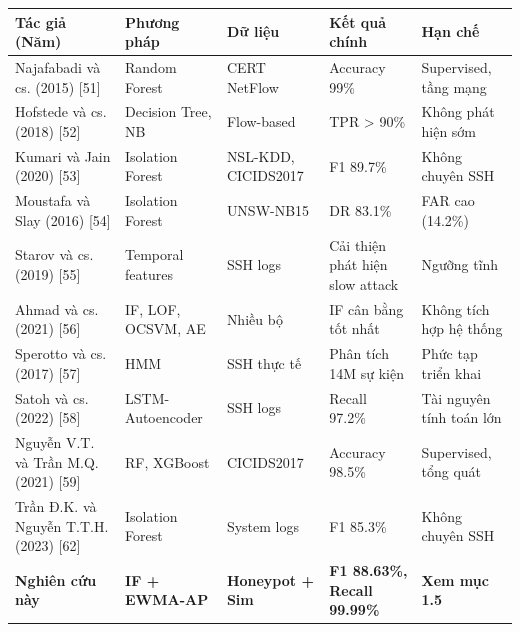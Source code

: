 \documentclass[
  a4paper]{report}
\newcounter{none} %
\begin{document}
{\def\LTcaptype{none} %
\begin{longtable}[]{@{}
  >{\raggedright\arraybackslash}p{}
  >{\raggedright\arraybackslash}p{}
  >{\raggedright\arraybackslash}p{}
  >{\raggedright\arraybackslash}p{}
  >{\raggedright\arraybackslash}p{}@{}}
\toprule\noalign{}
\begin{minipage}[b]{\linewidth}\raggedright
Tác giả (Năm)
\end{minipage} & \begin{minipage}[b]{\linewidth}\raggedright
Phương pháp
\end{minipage} & \begin{minipage}[b]{\linewidth}\raggedright
Dữ liệu
\end{minipage} & \begin{minipage}[b]{\linewidth}\raggedright
Kết quả chính
\end{minipage} & \begin{minipage}[b]{\linewidth}\raggedright
Hạn chế
\end{minipage} \\
\midrule\noalign{}
\endhead
\bottomrule\noalign{}
\endlastfoot
Najafabadi và cs. (2015) {[}51{]} & Random Forest & CERT NetFlow &
Accuracy 99\% & Supervised, tầng mạng \\
Hofstede và cs. (2018) {[}52{]} & Decision Tree, NB & Flow-based & TPR
\textgreater{} 90\% & Không phát hiện sớm \\
Kumari và Jain (2020) {[}53{]} & Isolation Forest & NSL-KDD, CICIDS2017
& F1 89.7\% & Không chuyên SSH \\
Moustafa và Slay (2016) {[}54{]} & Isolation Forest & UNSW-NB15 & DR
83.1\% & FAR cao (14.2\%) \\
Starov và cs. (2019) {[}55{]} & Temporal features & SSH logs & Cải thiện
phát hiện slow attack & Ngưỡng tĩnh \\
Ahmad và cs. (2021) {[}56{]} & IF, LOF, OCSVM, AE & Nhiều bộ & IF cân
bằng tốt nhất & Không tích hợp hệ thống \\
Sperotto và cs. (2017) {[}57{]} & HMM & SSH thực tế & Phân tích 14M sự
kiện & Phức tạp triển khai \\
Satoh và cs. (2022) {[}58{]} & LSTM-Autoencoder & SSH logs & Recall
97.2\% & Tài nguyên tính toán lớn \\
Nguyễn V.T. và Trần M.Q. (2021) {[}59{]} & RF, XGBoost & CICIDS2017 &
Accuracy 98.5\% & Supervised, tổng quát \\
Trần Đ.K. và Nguyễn T.T.H. (2023) {[}62{]} & Isolation Forest & System
logs & F1 85.3\% & Không chuyên SSH \\
\textbf{Nghiên cứu này} & \textbf{IF + EWMA-AP} & \textbf{Honeypot +
Sim} & \textbf{F1 88.63\%, Recall 99.99\%} & \textbf{Xem mục 1.5} \\
\end{longtable}
}
\end{document}
